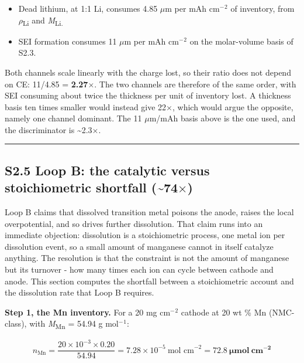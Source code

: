 \documentclass[11pt,a4paper]{article}
\begin{document}
\begin{itemize}
  \item Dead lithium, at 1:1 Li, consumes 4.85 \ensuremath{\mu}m per mAh cm\ensuremath{^{-}}\ensuremath{^{2}} of inventory, from \ensuremath{\rho}\textsubscript{Li} and \emph{M}\textsubscript{Li.}
  \item SEI formation consumes 11 \ensuremath{\mu}m per mAh cm\ensuremath{^{-}}\ensuremath{^{2}} on the molar-volume basis of S2.3.
\end{itemize}


Both channels scale linearly with the charge lost, so their ratio does not depend on CE: 11/4.85 = \textbf{2.27\ensuremath{\times}}. The two channels are therefore of the same order, with SEI consuming about twice the thickness per unit of inventory lost. A thickness basis ten times smaller would instead give 22\ensuremath{\times}, which would argue the opposite, namely one channel dominant. The 11 \ensuremath{\mu}m/mAh basis above is the one used, and the discriminator is \textasciitilde{}2.3\ensuremath{\times}.


\par\noindent\rule{\linewidth}{0.4pt}\par


\subsection*{S2.5 Loop B: the catalytic versus stoichiometric shortfall (\textasciitilde{}74\ensuremath{\times})}


Loop B claims that dissolved transition metal poisons the anode, raises the local overpotential, and so drives further dissolution. That claim runs into an immediate objection: dissolution is a stoichiometric process, one metal ion per dissolution event, so a small amount of manganese cannot in itself catalyze anything. The resolution is that the constraint is not the amount of manganese but its turnover - how many times each ion can cycle between cathode and anode. This section computes the shortfall between a stoichiometric account and the dissolution rate that Loop B requires.


\textbf{Step 1, the Mn inventory.} For a 20 mg cm\ensuremath{^{-}}\ensuremath{^{2}} cathode at 20 wt \% Mn (NMC-class), with \emph{M}\textsubscript{Mn} = 54.94 g mol\ensuremath{^{-}}\ensuremath{^{1}}:


\begin{equation}n_{\text{Mn}} = \frac{20\times10^{-3}\times0.20}{54.94} = 7.28\times10^{-5}\ \text{mol cm}^{-2} = \mathbf{72.8\ \mu mol\ cm^{-2}} \tag{S2.13}\end{equation}
\end{document}
